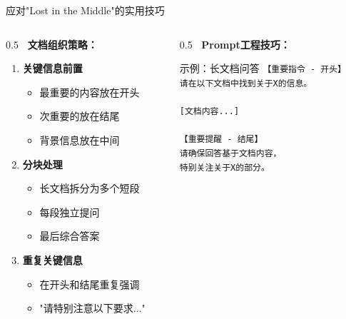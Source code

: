 \documentclass[aspectratio=169,11pt]{beamer}
\begin{document}
\begin{frame}{应对"Lost in the Middle"的实用技巧}
    \begin{columns}
        \begin{column}{0.5\textwidth}
            \textbf{\faCheckCircle\ 文档组织策略：}
            \begin{enumerate}
                \item \textbf{关键信息前置}
                    \begin{itemize}
                        \item 最重要的内容放在开头
                        \item 次重要的放在结尾
                        \item 背景信息放在中间
                    \end{itemize}
                \item \textbf{分块处理}
                    \begin{itemize}
                        \item 长文档拆分为多个短段
                        \item 每段独立提问
                        \item 最后综合答案
                    \end{itemize}
                \item \textbf{重复关键信息}
                    \begin{itemize}
                        \item 在开头和结尾重复强调
                        \item "请特别注意以下要求..."
                    \end{itemize}
            \end{enumerate}
        \end{column}
        \begin{column}{0.5\textwidth}
            \textbf{\faCode\ Prompt工程技巧：}
            \begin{exampleblock}{示例：长文档问答}
                \scriptsize
                \texttt{【重要指令 - 开头】}\\
                \texttt{请在以下文档中找到关于X的信息。}\\
                \texttt{}\\
                \texttt{[文档内容...]}\\
                \texttt{}\\
                \texttt{【重要提醒 - 结尾】}\\
                \texttt{请确保回答基于文档内容，}\\
                \texttt{特别关注关于X的部分。}
            \end{exampleblock}
            

\end{column}
\end{columns}
\end{frame}
\end{document}
